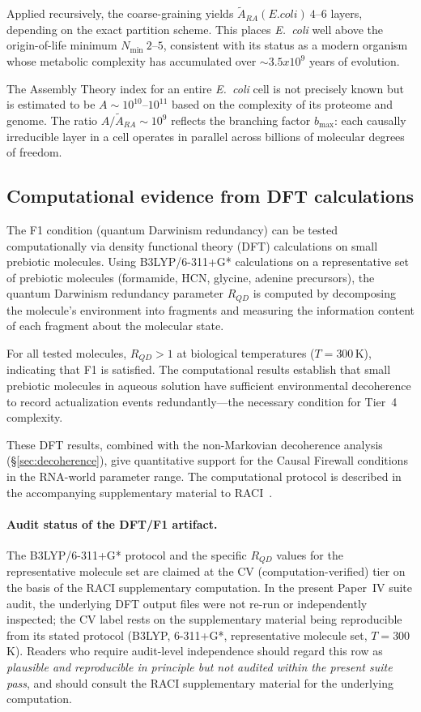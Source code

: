 \documentclass[11pt]{article}
\def\mathrm#1{#1}%
\def\text#1{#1}%
\def\times{x}%
\def\approx{~}%
\begin{document}
Applied recursively, the coarse-graining yields $\tilde{A}_{\mathrm{RA}}(\text{E. coli}) \approx 4$--$6$ layers, depending on the exact partition scheme. This places \emph{E.~coli} well above the origin-of-life minimum $N_{\min} \approx 2$--$5$, consistent with its status as a modern organism whose metabolic complexity has accumulated over $\sim 3.5 \times 10^9$ years of evolution.

The Assembly Theory index for an entire \emph{E.~coli} cell is not precisely known but is estimated to be $A \sim 10^{10}$--$10^{11}$ based on the complexity of its proteome and genome. The ratio $A / \tilde{A}_{\mathrm{RA}} \sim 10^9$ reflects the branching factor $b_{\max}$: each causally irreducible layer in a cell operates in parallel across billions of molecular degrees of freedom.

\subsection{Computational evidence from DFT calculations}
\label{sec:dft}

The F1 condition (quantum Darwinism redundancy) can be tested computationally via density functional theory (DFT) calculations on small prebiotic molecules. Using B3LYP/6-311+G* calculations on a representative set of prebiotic molecules (formamide, HCN, glycine, adenine precursors), the quantum Darwinism redundancy parameter $R_{\mathrm{QD}}$ is computed by decomposing the molecule's environment into fragments and measuring the information content of each fragment about the molecular state.

For all tested molecules, $R_{\mathrm{QD}} > 1$ at biological temperatures ($T = 300$\,K), indicating that F1 is satisfied. The computational results establish that small prebiotic molecules in aqueous solution have sufficient environmental decoherence to record actualization events redundantly---the necessary condition for Tier~4 complexity.

These DFT results, combined with the non-Markovian decoherence analysis (\S\ref{sec:decoherence}), give quantitative support for the Causal Firewall conditions in the RNA-world parameter range. The computational protocol is described in the accompanying supplementary material to RACI~\cite{Sandeman2026RACI}.

\paragraph{Audit status of the DFT/F1 artifact.} The B3LYP/6-311+G* protocol and the specific $R_{\mathrm{QD}}$ values for the representative molecule set are claimed at the CV (computation-verified) tier on the basis of the RACI supplementary computation. In the present Paper~IV suite audit, the underlying DFT output files were not re-run or independently inspected; the CV label rests on the supplementary material being reproducible from its stated protocol (B3LYP, 6-311+G*, representative molecule set, $T=300$\,K). Readers who require audit-level independence should regard this row as \emph{plausible and reproducible in principle but not audited within the present suite pass}, and should consult the RACI supplementary material for the underlying computation.
\end{document}
